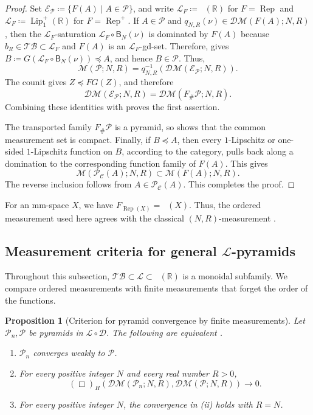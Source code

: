 \documentclass{amsart}
\theoremstyle{plain}
\newtheorem{proposition}[theorem]{Proposition}
\theoremstyle{definition}
\theoremstyle{remark}
\newcommand{\R}{\mathbb{R}}
\newcommand{\D}{\mathcal{D}}
\newcommand{\M}{\mathcal{M}}
\newcommand{\DM}{\mathcal{DM}}
\renewcommand{\L}{\mathcal{L}}
\newcommand{\TB}{\mathcal{TB}}
\newcommand{\Lup}{\operatorname{Lip}^{+}_{1}(\R)}
\DeclareMathOperator{\lipone}{Lip_1}
\newcommand{\haus}[1]{\left(#1\right)_H}
\begin{document}
\begin{proof}
Set $\mathcal E_{\mathcal P}\coloneqq\{F(A)\mid A\in\mathcal P\}$, and write $\L_F\coloneqq\lipone(\R)$ for $F=\operatorname{Rep}$ and $\L_F\coloneqq\Lup$ for $F=\operatorname{Rep}^{+}$. If $A\in\mathcal P$ and $q_{N,R}(\nu)\in\DM(F(A);N,R)$, then the $\L_F$-saturation $\L_F\circ\mathsf B_N(\nu)$ is dominated by $F(A)$ because $b_R\in\TB\subset\L_F$ and $F(A)$ is an $\L_F$-gd-set. Therefore,  gives $B\coloneqq G(\L_F\circ\mathsf B_N(\nu))\preceq A$, and hence $B\in\mathcal P$. Thus,
\[\M(\mathcal P;N,R)=q_{N,R}^{-1}(\DM(\mathcal E_{\mathcal P};N,R)).\]
The counit gives $Z\preceq FG(Z)$, and therefore
\[\DM(\mathcal E_{\mathcal P};N,R)=\DM(F_{\#}\mathcal P;N,R).\]
Combining these identities with  proves the first assertion.

The transported family $F_{\#}\mathcal P$ is a pyramid, so  shows that the common measurement set is compact. Finally, if $B\preceq A$, then every $1$-Lipschitz or one-sided $1$-Lipschitz function on $B$, according to the category, pulls back along a domination to the corresponding function family of $F(A)$. This gives
\[\M(\mathcal P_{\mathcal C}(A);N,R)\subset\M(F(A);N,R).\]
The reverse inclusion follows from $A\in\mathcal P_{\mathcal C}(A)$.
This completes the proof.
\end{proof}

For an mm-space $X$, we have $F_{\operatorname{Rep}(X)}=\lipone(X)$. Thus, the ordered measurement used here agrees with the classical $(N,R)$-measurement \cite[Definition~5.37]{shioya2016mmg}.

\subsection{Measurement criteria for general \texorpdfstring{$\L$}{L}-pyramids}
\label{subsec:appendix-general-l-local-theory}

Throughout this subsection, $\TB\subset\L\subset\lipone(\R)$ is a monoidal subfamily. We compare ordered measurements with finite measurements that forget the order of the functions.

\begin{proposition}[Criterion for pyramid convergence by finite measurements]
\label{prop:gds2-finite-measurement-criterion}
Let $\mathcal P_n,\mathcal P$ be pyramids in $\L\circ\D$. The following are equivalent \cite[Proposition~7.2]{gds2}.
\begin{enumerate}[label=\textup{(\roman*)}]
\item $\mathcal P_n$ converges weakly to $\mathcal P$.
\item For every positive integer $N$ and every real number $R>0$,
\[\haus{\Box}(\DM(\mathcal P_n;N,R),\DM(\mathcal P;N,R))\longrightarrow0.\]
\item For every positive integer $N$, the convergence in \textup{(ii)} holds with $R=N$.
\end{enumerate}
\end{proposition}
\end{document}
